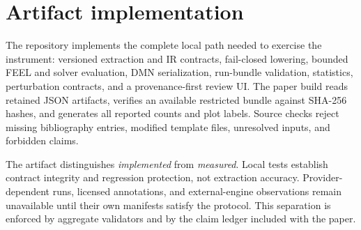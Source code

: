 \section{Artifact implementation}

The repository implements the complete local path needed to exercise the
instrument: versioned extraction and IR contracts, fail-closed lowering,
bounded FEEL and solver evaluation, DMN serialization, run-bundle validation,
statistics, perturbation contracts, and a provenance-first review UI. The paper
build reads retained JSON artifacts, verifies an available restricted bundle
against SHA-256 hashes, and generates all reported counts and plot labels.
Source checks reject missing bibliography entries, modified template files,
unresolved inputs, and forbidden claims.



The artifact distinguishes \emph{implemented} from \emph{measured}. Local tests
establish contract integrity and regression protection, not extraction
accuracy. Provider-dependent runs, licensed annotations, and external-engine
observations remain unavailable until their own manifests satisfy the protocol.
This separation is enforced by aggregate validators and by the claim ledger
included with the paper.
